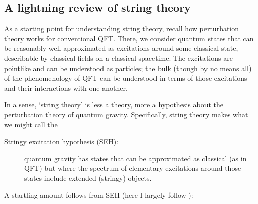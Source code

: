 \documentclass[12pt]{article}
\begin{document}
\subsection{A lightning review of string theory}

As a starting point for understanding string theory, recall how perturbation theory works for conventional QFT. There, we consider quantum states that can be reasonably-well-approximated as excitations around some classical state, describable by classical fields on a classical spacetime. The excitations are pointlike and can be understood as particles; the bulk (though by no means all) of the phenomenology of QFT can be understood in terms of those excitations and their interactions with one another.

In a sense, `string theory' is less a theory, more a hypothesis about the perturbation theory of quantum gravity. Specifically, string theory makes what we might call the 
\begin{description}
\item[Stringy excitation hypothesis (SEH):] quantum gravity has states that can be approximated as classical (as in QFT) but where the spectrum of elementary excitations around those states include extended (stringy) objects.
\end{description}
A startling amount follows from SEH (here I largely follow ):
\end{document}
